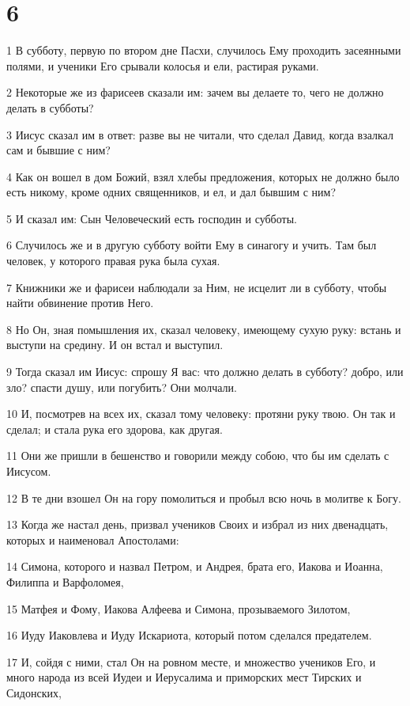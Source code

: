 \chapter{6}

\par 1 В субботу, первую по втором дне Пасхи, случилось Ему проходить засеянными полями, и ученики Его срывали колосья и ели, растирая руками.
\par 2 Некоторые же из фарисеев сказали им: зачем вы делаете то, чего не должно делать в субботы?
\par 3 Иисус сказал им в ответ: разве вы не читали, что сделал Давид, когда взалкал сам и бывшие с ним?
\par 4 Как он вошел в дом Божий, взял хлебы предложения, которых не должно было есть никому, кроме одних священников, и ел, и дал бывшим с ним?
\par 5 И сказал им: Сын Человеческий есть господин и субботы.
\par 6 Случилось же и в другую субботу войти Ему в синагогу и учить. Там был человек, у которого правая рука была сухая.
\par 7 Книжники же и фарисеи наблюдали за Ним, не исцелит ли в субботу, чтобы найти обвинение против Него.
\par 8 Но Он, зная помышления их, сказал человеку, имеющему сухую руку: встань и выступи на средину. И он встал и выступил.
\par 9 Тогда сказал им Иисус: спрошу Я вас: что должно делать в субботу? добро, или зло? спасти душу, или погубить? Они молчали.
\par 10 И, посмотрев на всех их, сказал тому человеку: протяни руку твою. Он так и сделал; и стала рука его здорова, как другая.
\par 11 Они же пришли в бешенство и говорили между собою, что бы им сделать с Иисусом.
\par 12 В те дни взошел Он на гору помолиться и пробыл всю ночь в молитве к Богу.
\par 13 Когда же настал день, призвал учеников Своих и избрал из них двенадцать, которых и наименовал Апостолами:
\par 14 Симона, которого и назвал Петром, и Андрея, брата его, Иакова и Иоанна, Филиппа и Варфоломея,
\par 15 Матфея и Фому, Иакова Алфеева и Симона, прозываемого Зилотом,
\par 16 Иуду Иаковлева и Иуду Искариота, который потом сделался предателем.
\par 17 И, сойдя с ними, стал Он на ровном месте, и множество учеников Его, и много народа из всей Иудеи и Иерусалима и приморских мест Тирских и Сидонских,
